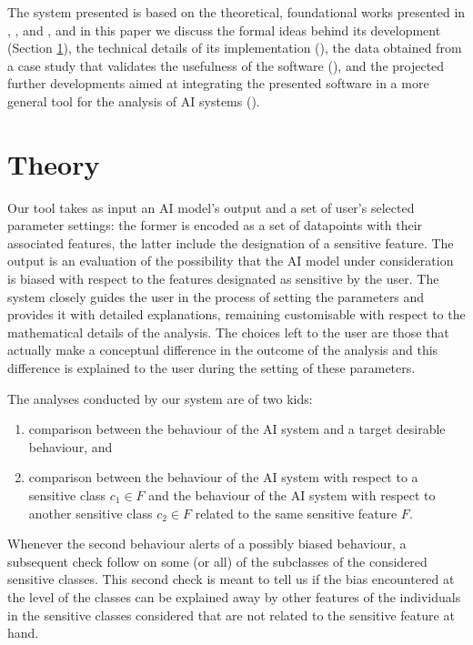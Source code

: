 \documentclass[
]{ceurart}
\begin{document}
The system presented is based on the theoretical, foundational works presented in \cite{dap21}, \cite{dagp22}, and \cite{gp23}, and in this paper we discuss the formal ideas behind its development (Section \ref{sec:theory}), the technical details of its implementation  (), the data obtained from a case study that validates the usefulness of the software (), and the projected further developments aimed at integrating the presented software in a more general tool for the analysis of AI systems ().

\section{Theory}\label{sec:theory}

Our tool takes as input an AI model's output and a set of user's selected parameter settings: the former is encoded as a set of datapoints with their associated features, the latter include the designation of a sensitive feature. The output is an evaluation of the possibility that the AI model under consideration is biased with respect to the features designated as sensitive by the user. The system closely guides the user in the process of setting the parameters and provides it with detailed explanations, remaining customisable with respect to the mathematical details of the analysis. The choices left to the user are those that actually make a conceptual difference in the outcome of the analysis and this difference is explained to the user during the setting of these parameters.

The analyses conducted by our system are of two kids: 

\begin{enumerate}
	\item comparison between the behaviour of the AI system and a target desirable behaviour, and
	
	\item comparison between the behaviour of the AI system with respect to a sensitive class $c_1\in F$ and the behaviour of the AI system with respect to another sensitive class $c_2\in F$ related to the same sensitive feature $F$.
\end{enumerate}

Whenever the second behaviour alerts of a possibly biased behaviour, a subsequent check follow on some (or all) of the subclasses of the considered sensitive classes. This second check is meant to tell us if the bias encountered at the level of the classes can be explained away by other features of the individuals in the sensitive classes considered that are not related to the sensitive feature at hand.
\end{document}
